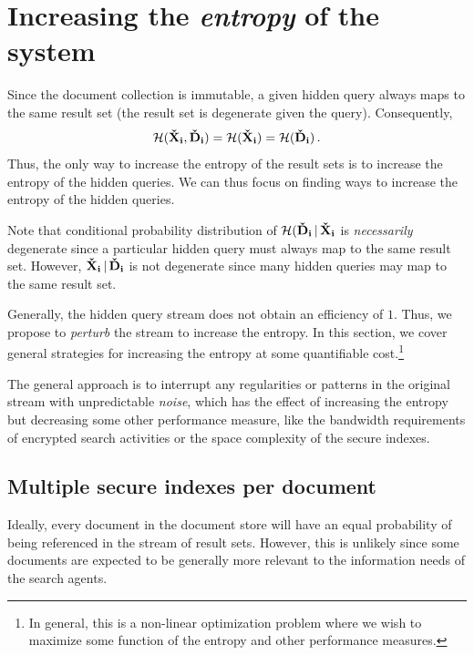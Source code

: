 \documentclass[final,11pt]{article}
\newcommand{\rvhrs}[1][]{%
   \ifthenelse{ \equal{#1}{} }
      {\ensuremath{\rv{\vec{\check{D}}}}}
      {\ensuremath{\rv{\vec{\check{D}_{#1}}}}}
}
\newcommand{\rvhqb}[1][]{%
   \ifthenelse{ \equal{#1}{} }
      {\ensuremath{\rv{\vec{\check{X}}}}}
      {\ensuremath{\rv{\vec{\check{X}_{#1}}}}}
}
\newcommand{\rv}[1]{\mathrm{#1}}
\newcommand{\entropy}{\operatorname{\mathcal{H}}}
\newcommand{\given}{{\,|\,}}
\renewcommand{\vec}[1]{\boldsymbol{\mathbf{#1}}}
\numberwithin{equation}{section}
\theoremstyle{plain}
\theoremstyle{remark}
\begin{document}
\section{Increasing the \emph{entropy} of the system}
\label{sec:techniques}
Since the document collection is immutable, a given hidden query always maps to the same result set (the result set is degenerate given the query). Consequently,
\begin{equation}
    \entropy(\rvhqb[i], \rvhrs[i]) = \entropy(\rvhqb[i]) = \entropy(\rvhrs[i])\,.
\end{equation}
Thus, the only way to increase the entropy of the result sets is to increase the entropy of the hidden queries. We can thus focus on finding ways to increase the entropy of the hidden queries. 

Note that conditional probability distribution of $\entropy(\rvhrs[i] \given \rvhqb[i]$ is \emph{necessarily} degenerate since a particular hidden query must always map to the same result set. However, $\rvhqb[i] \given \rvhrs[i]$ is not degenerate since many hidden queries may map to the same result set.

Generally, the hidden query stream does not obtain an efficiency of $1$. Thus, we propose to \emph{perturb} the stream to increase the entropy. In this section, we cover general strategies for increasing the entropy at some quantifiable cost.\footnote{In general, this is a non-linear optimization problem where we wish to maximize some function of the entropy and other performance measures.}

The general approach is to interrupt any regularities or patterns in the original stream with unpredictable \emph{noise}, which has the effect of increasing the entropy but decreasing some other performance measure, like the bandwidth requirements of encrypted search activities or the space complexity of the secure indexes.


\subsection{Multiple secure indexes per document}
Ideally, every document in the document store will have an equal probability of being referenced in the stream of result sets. However, this is unlikely since some documents are expected to be generally more relevant to the information needs of the search agents.
\end{document}
